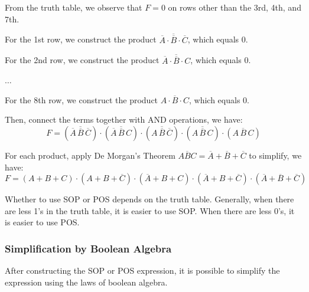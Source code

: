 \begin{example}
    From the truth table, we observe that $F=0$ on rows other than the 3rd, 4th, and 7th.

    For the 1st row, we construct the product
    $\overline{\overline{A}\cdot\overline{B}\cdot\overline{C}}$, which equals 0.

    For the 2nd row, we construct the product
    $\overline{\overline{A}\cdot\overline{B}\cdot C}$, which equals 0.

    $\dots$

    For the 8th row, we construct the product
    $\overline{A\cdot B\cdot C}$, which equals 0.

    Then, connect the terms together with AND operations, we have:
    \begin{equation*}
        F = \left(\overline{\overline{A}\,\overline{B}\,\overline C }\right) \cdot 
            \left(\overline{\overline{A}\,\overline{B}\,          C }\right) \cdot 
            \left(\overline{          A \,\overline{B}\,\overline{C}}\right) \cdot 
            \left(\overline{          A \,\overline{B}\,          C }\right) \cdot
            \left(\overline{          A \,          B \,          C }\right)
    \end{equation*}

    For each product, apply De Morgan's Theorem
    $\overline{ABC} = \overline{A} + \overline{B} + \overline{C}$ to simplify, we have:
    \begin{equation*}
        F = (A+B+C)\cdot
            (A+B+\overline{C})\cdot
            (\overline{A}+B+C)\cdot
            (\overline{A}+B+\overline{C})\cdot
            (\overline{A}+\overline{B}+\overline{C})
    \end{equation*}
\end{example}

\begin{remark}
    Whether to use SOP or POS depends on the truth table. Generally, when there are
    less 1's in the truth table, it is easier to use SOP. When there are less 0's,
    it is easier to use POS.
\end{remark}

\subsubsection{Simplification by Boolean Algebra}

After constructing the SOP or POS expression, it is possible to simplify the expression
using the laws of boolean algebra.


